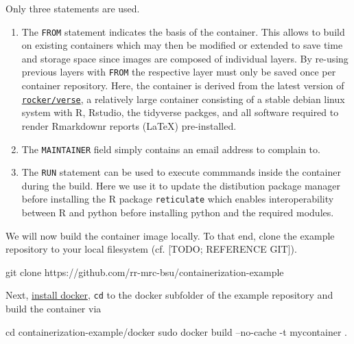 \documentclass[]{book}
\newenvironment{Shaded}{\begin{snugshade}}{\end{snugshade}}
\newcommand{\FunctionTok}[1]{\textcolor[rgb]{0.00,0.00,0.00}{#1}}
\newcommand{\BuiltInTok}[1]{#1}
\newcommand{\NormalTok}[1]{#1}
\providecommand{\tightlist}{%
  \setlength{\itemsep}{0pt}\setlength{\parskip}{0pt}}
\begin{document}
Only three statements are used.

\begin{enumerate}
\def\labelenumi{\arabic{enumi}.}
\tightlist
\item
  The \texttt{FROM} statement indicates the basis of the container. This
  allows to build on existing containers which may then be modified or
  extended to save time and storage space since images are composed of
  individual layers. By re-using previous layers with \texttt{FROM} the
  respective layer must only be saved once per container repository.
  Here, the container is derived from the latest version of
  \href{https://www.rocker-project.org/}{\texttt{rocker/verse}}, a
  relatively large container consisting of a stable debian linux system
  with R, Rstudio, the tidyverse packges, and all software required to
  render Rmarkdownr reports (LaTeX) pre-installed.
\item
  The \texttt{MAINTAINER} field simply contains an email address to
  complain to.
\item
  The \texttt{RUN} statement can be used to execute commmands inside the
  container during the build. Here we use it to update the distibution
  package manager before installing the R package \texttt{reticulate}
  which enables interoperability between R and python before installing
  python and the required modules.
\end{enumerate}

We will now build the container image locally. To that end, clone the
example repository to your local filesystem (cf. {[}TODO; REFERENCE
GIT{]}).

\begin{Shaded}
\begin{Highlighting}[]
\FunctionTok{git}\NormalTok{ clone https://github.com/rr-mrc-bsu/containerization-example}
\end{Highlighting}
\end{Shaded}

Next, \href{https://docs.docker.com/install/}{install docker},
\texttt{cd} to the docker subfolder of the example repository and build
the container via

\begin{Shaded}
\begin{Highlighting}[]
\BuiltInTok{cd}\NormalTok{ containerization-example/docker}
\FunctionTok{sudo}\NormalTok{ docker build --no-cache -t mycontainer .}
\end{Highlighting}
\end{Shaded}
\end{document}
